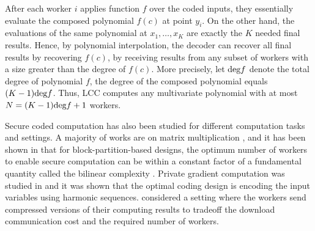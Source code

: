 After each worker $i$ applies function $f$ over the coded inputs, they essentially evaluate the composed polynomial $f(c)$ at point $y_i$. On the other hand, the evaluations of the same polynomial at $x_1,\ldots,x_{K}$ are exactly the $K$ needed final results. Hence, by polynomial interpolation, the decoder can recover all final results by recovering $f(c)$, by receiving results from any subset of workers with a size greater than the degree of  $f(c)$. More precisely, let $\textup{deg} f$ denote the total degree of polynomial $f$, the degree of the composed polynomial equals $(K-1)\textup{deg} f$. Thus, LCC computes any multivariate polynomial with at most $N=(K-1)\textup{deg} f+1 $ workers. 

Secure coded computation has also been studied for different computation tasks and settings. A majority of works are on matrix multiplication \cite{chang2018capacity, 8382305, DBLP:journals/corr/abs-1810-13006, DBLP:journals/corr/abs-1812-09962, 8613446, DBLP:journals/corr/abs-1901-07705, kim2019private, 8675905 ,chang2019upload, 8761275, nodehi2019secure, jia2019capacity, kakar2019uplinkdownlink, aliasgari2019private, d2019degree, 9174167}, and it has been shown in \cite{8437563, 9174167} that for block-partition-based designs, the optimum number of workers to enable secure computation can be within a constant factor of a fundamental quantity called the bilinear complexity \cite{gs005}. Private gradient computation was studied in \cite{8849245} and it was shown that the optimal coding design is encoding the input variables using harmonic sequences. \cite{9333639,8849547} considered a setting where the workers send compressed versions of their computing results to tradeoff the download communication cost and the required number of workers. 

